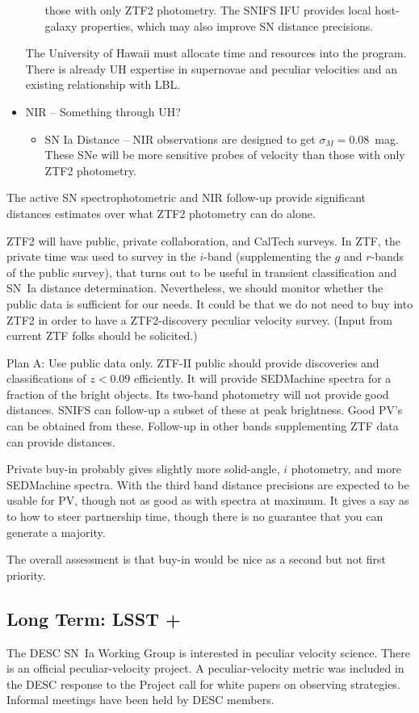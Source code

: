 \begin{itemize}
\begin{itemize}
those with only ZTF2 photometry.  The SNIFS IFU provides local host-galaxy properties, which may also improve SN distance precisions.
\end{itemize}
The University of Hawaii must allocate time and resources into the program.  There is already UH expertise in supernovae and peculiar velocities and an existing relationship
with LBL.
\item NIR -- Something through UH?
\begin{itemize}
\item SN Ia Distance -- NIR observations are designed to get $\sigma_M=0.08$~mag.  These SNe will be more sensitive probes of velocity
than those with only ZTF2 photometry.
\end{itemize}
\end{itemize}
The active SN spectrophotometric and NIR follow-up provide significant distances estimates over
what ZTF2 photometry can do alone.




ZTF2 will have public, private collaboration, and CalTech surveys.    In ZTF,
the private time was used to survey in the $i$-band (supplementing the $g$ and $r$-bands of the public survey), that turns out to be useful in transient classification and SN~Ia distance determination.
Nevertheless, we should monitor whether the public data is sufficient for our needs.  It could be that we do not need to buy into ZTF2 in order to have
a ZTF2-discovery peculiar velocity survey.  (Input from current ZTF folks should be solicited.)

Plan A: Use public data only.  ZTF-II public should provide discoveries and classifications of $z<0.09$ efficiently.  It will provide SEDMachine spectra for a
fraction of the bright objects.  Its two-band photometry will not provide good distances.  SNIFS can follow-up a subset of these at peak brightness.
Good PV's can be obtained from these.  Follow-up in other bands supplementing ZTF data can provide distances.

Private buy-in probably gives slightly more solid-angle, $i$ photometry, and more SEDMachine spectra.  With the third band distance precisions are expected
to be usable for PV, though not as good as with spectra at maximum.  It gives a say as to how to steer partnership time, though there is no guarantee that
you can generate a majority.

The overall assessment is that buy-in would be nice as a second but not first priority.

\subsection{Long Term: LSST +}
The DESC SN~Ia Working Group is interested in peculiar velocity science.  There is an official peculiar-velocity project.  A peculiar-velocity
metric was included in the DESC response to the Project call for white papers on observing strategies.
Informal meetings have been held by DESC members.

